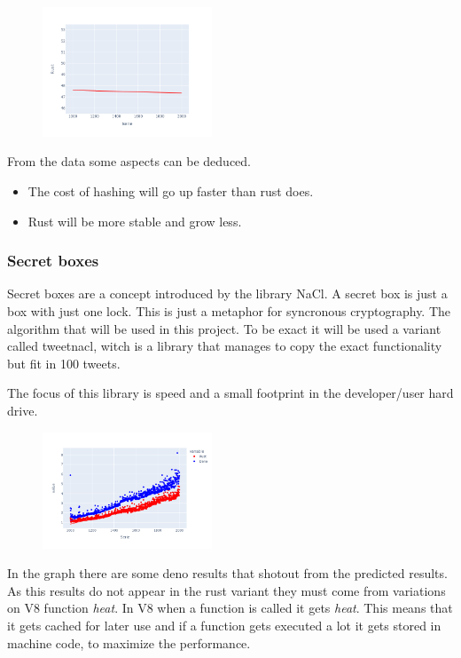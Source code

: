 \documentclass[12pt, letterpaper]{article}
\begin{document}
\begin{multicols}{2}
    \begin{figure}[H]
        \centering
        \includegraphics[width=0.45\textwidth]{images/trend_hash_rust.png}
    \end{figure}

    From the data some aspects can be deduced.
    \begin{itemize}
        \item The cost of hashing will go up faster than rust does.
        \item Rust will be more stable and grow less.
    \end{itemize}

    \subsubsection{Secret boxes}

    Secret boxes are a concept introduced by the library NaCl. A secret box is just a box with just one lock. This is just a metaphor for syncronous cryptography. The algorithm that will be used in this project. To be exact it will be used a variant called tweetnacl, witch is a library that manages to copy the exact functionality but fit in 100 tweets.

    The focus of this library is speed and a small footprint in the developer/user hard drive.

    \begin{figure}[H]
        \centering
        \includegraphics[width=0.45\textwidth]{images/secretbox_lines}
    \end{figure}

    In the graph there are some deno results that shotout from the predicted results. As this results do not appear in the rust variant they must come from variations on V8 function \textit{heat}. In V8 when a function is called it gets \textit{heat}. This means that it gets cached for later use and if a function gets executed a lot it gets stored in machine code, to maximize the performance.


\end{multicols}
\end{document}
